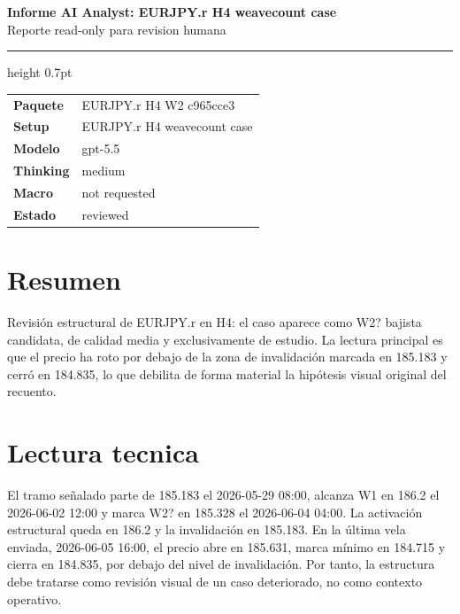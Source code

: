 \documentclass[11pt,a4paper]{article}
\begin{document}
\begin{center}
{\huge\bfseries Informe AI Analyst: EURJPY.r H4 weavecount case}\\[0.25em]
{\large Reporte read-only para revision humana}
\end{center}

\vspace{0.2em}
\hrule height 0.7pt
\vspace{0.9em}

\begin{tabularx}{\textwidth}{>{\bfseries}p{3.2cm}X}
Paquete & EURJPY.r H4 W2 c965cce3 \\
Setup & EURJPY.r H4 weavecount case \\
Modelo & gpt-5.5 \\
Thinking & medium \\
Macro & not requested \\
Estado & reviewed \\
\end{tabularx}

\vspace{0.75em}

\vspace{0.4em}

\section*{Resumen}
Revisión estructural de EURJPY.r en H4: el caso aparece como W2? bajista candidata, de calidad media y exclusivamente de estudio. La lectura principal es que el precio ha roto por debajo de la zona de invalidación marcada en 185.183 y cerró en 184.835, lo que debilita de forma material la hipótesis visual original del recuento.

\section*{Lectura tecnica}
El tramo señalado parte de 185.183 el 2026-05-29 08:00, alcanza W1 en 186.2 el 2026-06-02 12:00 y marca W2? en 185.328 el 2026-06-04 04:00. La activación estructural queda en 186.2 y la invalidación en 185.183. En la última vela enviada, 2026-06-05 16:00, el precio abre en 185.631, marca mínimo en 184.715 y cierra en 184.835, por debajo del nivel de invalidación. Por tanto, la estructura debe tratarse como revisión visual de un caso deteriorado, no como contexto operativo.
\end{document}
